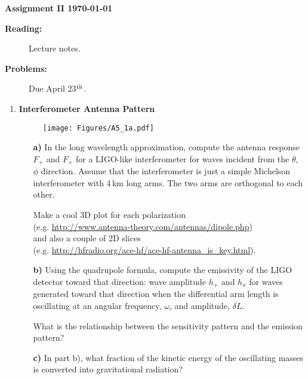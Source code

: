 \documentclass[12pt,twoside]{article}
\begin{document}
%
\centerline{\large\bf  \hfill Assignment II \hfill  \today}

\medskip
\begin{description}
\item[{\bf Reading:}] Lecture notes. \\
\item[{\bf Problems:} \hfill ] Due April 23$^{\rm th}$.
\end{description}


\medskip

\begin{enumerate}

\item
{\bf Interferometer Antenna Pattern}
\begin{figure}[h]
    \centering
    \texttt{[image: Figures/A5\_1a.pdf]}

    \label{fig:A5_1a}
\end{figure}
\begin{itemize}

\item[\bf a)] In the long wavelength approximation, compute the antenna response $F_+$ and $F_\times$ for a LIGO-like interferometer for waves incident from the $\theta$, $\phi$ direction. Assume that the interferometer
is just a simple Michelson interferometer with 4\,km long arms. The two arms are orthogonal to each other.

Make a cool 3D plot for each polarization \\
(e.g. \url{http://www.antenna-theory.com/antennas/dipole.php}) \\
and also a couple of 2D slices \\
(e.g. \url{http://hfradio.org/ace-hf/ace-hf-antenna_is_key.html}).

\item[\bf b)] Using the quadrupole formula, compute the emissivity of the LIGO detector toward that direction:
wave amplitude $h_+$ and $h_x$ for waves generated toward that direction when the differential arm length is oscillating at an angular frequency, $\omega$, and amplitude, $\delta L$.

What is the relationship between the sensitivity pattern and the emission pattern?


\item[\bf c)] In part b), what fraction of the kinetic energy of the oscillating masses is converted into gravitational radiation?


\end{itemize}


\end{enumerate}
\end{document}
